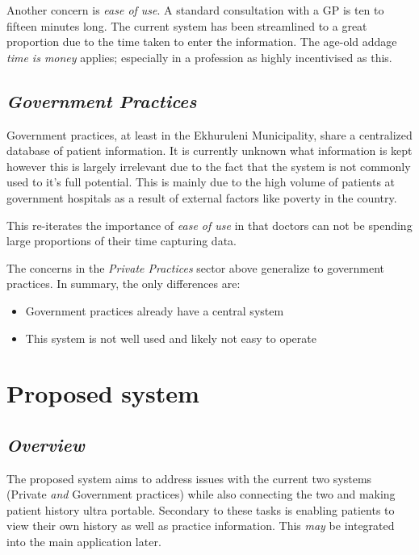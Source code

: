 \documentclass[a4paper]{article}
\begin{document}
Another concern is \emph{ease of use}. A standard consultation with a GP is ten to fifteen minutes long. The current system has been streamlined to a great proportion due to the time taken to enter the information. The age-old addage \emph{time is money} applies; especially in a profession as highly incentivised as this.

\subsection{\textit{Government Practices}}
Government practices, at least in the Ekhuruleni Municipality, share a centralized database of patient information. It is currently unknown what information is kept however this is largely irrelevant due to the fact that the system is not commonly used to it's full potential. This is mainly due to the high volume of patients at government hospitals as a result of external factors like poverty in the country.

This re-iterates the importance of \emph{ease of use} in that doctors can not be spending large proportions of their time capturing data.

The concerns in the \emph{Private Practices} sector above generalize to government practices. In summary, the only differences are:
\begin{itemize}
	\item Government practices already have a central system
	\item This system is not well used and likely not easy to operate
\end{itemize}
	
\newpage

\section{Proposed system}
\subsection{\textit{Overview}}
The proposed system aims to address issues with the current two systems (Private \emph{and} Government practices) while also connecting the two and making patient history ultra portable. Secondary to these tasks is enabling patients to view their own history as well as practice information. This \emph{may} be integrated into the main application later.
		
\end{document}
